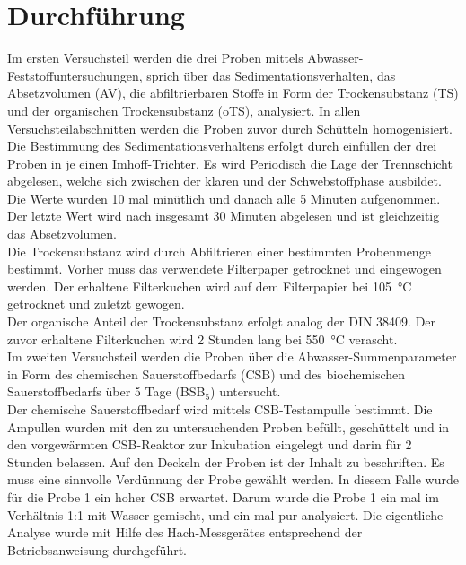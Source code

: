 \chapter{Durchführung}
\label{sec:durchfuerung}
Im ersten Versuchsteil werden die drei Proben mittels Abwasser-Feststoffuntersuchungen, sprich über das Sedimentationsverhalten, das Absetzvolumen (AV), die abfiltrierbaren Stoffe in Form der Trockensubstanz (TS) und der organischen Trockensubstanz (oTS), analysiert. In allen Versuchsteilabschnitten werden die Proben zuvor durch Schütteln homogenisiert.\\
Die Bestimmung des Sedimentationsverhaltens erfolgt durch einfüllen der drei Proben in je einen Imhoff-Trichter. Es wird Periodisch die Lage der Trennschicht abgelesen, welche sich zwischen der klaren und der Schwebstoffphase ausbildet.
Die Werte wurden 10 mal minütlich und danach alle 5 Minuten aufgenommen. Der letzte Wert wird nach insgesamt 30 Minuten abgelesen und ist gleichzeitig das Absetzvolumen. \\
Die Trockensubstanz wird durch Abfiltrieren einer bestimmten Probenmenge bestimmt. Vorher muss das verwendete Filterpaper getrocknet und eingewogen werden. Der erhaltene Filterkuchen wird auf dem Filterpapier bei \SI{105}{\degreeCelsius} getrocknet und zuletzt gewogen.\\
Der organische Anteil der Trockensubstanz erfolgt analog der DIN 38409. Der zuvor erhaltene Filterkuchen wird 2 Stunden lang bei \SI{550}{\degreeCelsius} verascht.\\

Im zweiten Versuchsteil werden die Proben über die Abwasser-Summenparameter in Form des chemischen Sauerstoffbedarfs (CSB) und des biochemischen Sauerstoffbedarfs über 5 Tage (BSB$_5$) untersucht.\\

Der chemische Sauerstoffbedarf wird mittels CSB-Testampulle bestimmt. Die Ampullen wurden mit den zu untersuchenden Proben befüllt, geschüttelt und in den vorgewärmten CSB-Reaktor zur Inkubation eingelegt und darin für 2 Stunden belassen. Auf den Deckeln der Proben ist der Inhalt zu beschriften. Es muss eine sinnvolle Verdünnung der Probe gewählt werden. In diesem Falle wurde für die Probe 1 ein hoher CSB erwartet. Darum wurde die Probe 1 ein mal im Verhältnis 1:1 mit Wasser gemischt, und ein mal pur analysiert. Die eigentliche Analyse wurde mit Hilfe des Hach-Messgerätes entsprechend der Betriebsanweisung durchgeführt.\\

